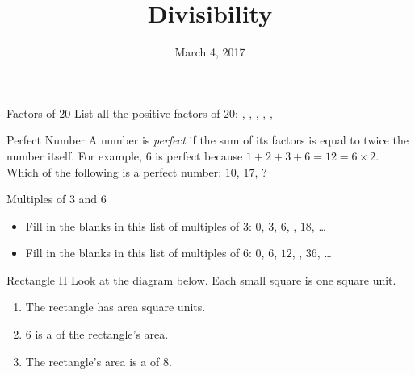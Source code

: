 \documentclass[12pt,letterpaper]{article}
\title{Divisibility}
\date{March 4, 2017}
\begin{document}
\maketitle

\thispagestyle{empty}

\begin{problem}{Factors of \(20\)}
 List all the positive factors of \(20\):
 , ,
 , ,
 , 
\end{problem}

\begin{problem}{Perfect Number}
  A number is \emph{perfect} if the sum of its factors is equal to twice the
  number itself. For example, \(6\) is perfect because \(1+2+3+6=12=6\times2\).
  Which of the following is a perfect number: \(10\), \(17\),
  ?
\end{problem}

\begin{problem}{Multiples of \(3\) and \(6\)}
 \begin{itemize}
  \item Fill in the blanks in this list of multiples of \(3\): \(0\), \(3\),
  \(6\), ,
  \(18\), \ldots

  \item Fill in the blanks in this list of multiples of \(6\): \(0\), \(6\),
  \(12\), ,
  \(36\), \ldots
 \end{itemize}
\end{problem}

\begin{problem}{Rectangle II}
 Look at the diagram below. Each small square is one square unit.

 \begin{center}
 \end{center}

 \begin{enumerate}
  \item The rectangle has area  square units.
  \item \(6\) is a  of the
  rectangle's area.
  \item The rectangle's area is a
   of \(8\).
 \end{enumerate}
\end{problem}
\end{document}
